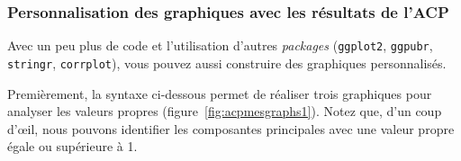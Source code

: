 \documentclass[
  11pt,
  french,
]{book}
\begin{document}
\hypertarget{sect12233}{%
\subsubsection{Personnalisation des graphiques avec les résultats de l'ACP}\label{sect12233}}

Avec un peu plus de code et l'utilisation d'autres \emph{packages} (\texttt{ggplot2}, \texttt{ggpubr}, \texttt{stringr}, \texttt{corrplot}), vous pouvez aussi construire des graphiques personnalisés.

Premièrement, la syntaxe ci-dessous permet de réaliser trois graphiques pour analyser les valeurs propres (figure~\ref{fig:acpmesgraphs1}). Notez que, d'un coup d'œil, nous pouvons identifier les composantes principales avec une valeur propre égale ou supérieure à 1.
\end{document}
